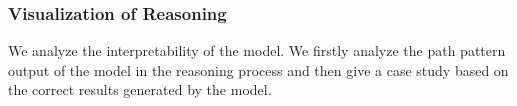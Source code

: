 \documentclass[review]{elsarticle}
\begin{document}
\begin{sloppypar}


\subsubsection{Visualization of Reasoning}
We analyze the interpretability of the model. We firstly analyze the path pattern output of the model in the reasoning process and then give a case study based on the correct results generated by the model. 


\end{sloppypar}
\end{document}
